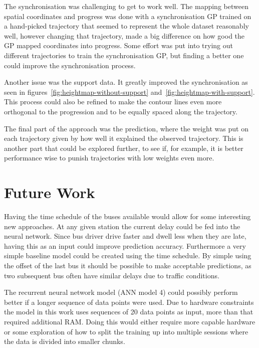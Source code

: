 The synchronisation was challenging to get to work well. The mapping between spatial coordinates and progress was done with a synchronisation GP trained on a hand-picked trajectory that seemed to represent the whole dataset reasonably well, however changing that trajectory, made a big difference on how good the GP mapped coordinates into progress. Some effort was put into trying out different trajectories to train the synchronisation GP, but finding a better one could improve the synchronisation process.

Another issue was the support data. It greatly improved the synchronisation as seen in figures~\ref{fig:heightmap-without-support} and~\ref{fig:heightmap-with-support}. This process could also be refined to make the contour lines even more orthogonal to the progression and to be equally spaced along the trajectory. 

The final part of the approach was the prediction, where the weight was put on each trajectory given by how well it explained the observed trajectory. This is another part that could be explored further, to see if, for example, it is better performance wise to punish trajectories with low weights even more.

\section{Future Work}
\label{sec:future-work}
Having the time schedule of the buses available would allow for some interesting new approaches. At any given station the current delay could be fed into the neural network. Since bus driver drive faster and dwell less when they are late, having this as an input could improve prediction accuracy. Furthermore a very simple baseline model could be created using the time schedule. By simple using the offset of the last bus it should be possible to make acceptable predictions, as two subsequent bus often have similar delays due to traffic conditions.

The recurrent neural network model (ANN model 4) could possibly perform better if a longer sequence of data points were used. Due to hardware constraints the model in this work uses sequences of 20 data points as input, more than that required additional RAM. Doing this would either require more capable hardware or some exploration of how to split the training up into multiple sessions where the data is divided into smaller chunks.


